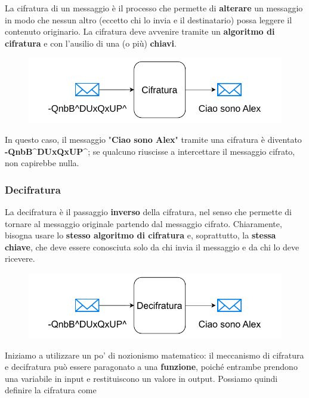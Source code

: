 \documentclass{rapport}
\begin{document}
La cifratura di un messaggio è il processo che permette di \textbf{alterare} un messaggio in modo che nessun altro (eccetto chi lo invia e il destinatario) possa leggere il contenuto originario. La cifratura deve avvenire tramite un \textbf{algoritmo di cifratura} e con l’ausilio di una (o più) \textbf{chiavi}.


\begin{figure}[h]
     \centering
    \includegraphics[width=0.8\linewidth]{logos/0_2_cripto.pdf}
\end{figure}

In questo caso, il messaggio "\textbf{Ciao sono Alex}" tramite una cifratura è diventato \textbf{-QnbB\^{}DUxQxUP\^{}}; se qualcuno riuscisse a intercettare il messaggio cifrato, non capirebbe nulla.


\subsubsection{Decifratura} 

La decifratura è il passaggio \textbf{inverso} della cifratura, nel senso che permette di tornare al messaggio originale partendo dal messaggio cifrato. Chiaramente, bisogna usare lo \textbf{stesso algoritmo di cifratura} e, soprattutto, la \textbf{stessa chiave}, che deve essere conosciuta solo da chi invia il messaggio e da chi lo deve ricevere.


\begin{figure}[h]
     \centering
    \includegraphics[width=0.8\linewidth]{logos/0_3_cripto.pdf}
\end{figure}

\newpage

Iniziamo a utilizzare un po' di nozionismo matematico: il meccanismo di cifratura e decifratura può essere paragonato a una \textbf{funzione}, poiché entrambe prendono una variabile in input e restituiscono un valore in output. Possiamo quindi definire la cifratura come
\end{document}
